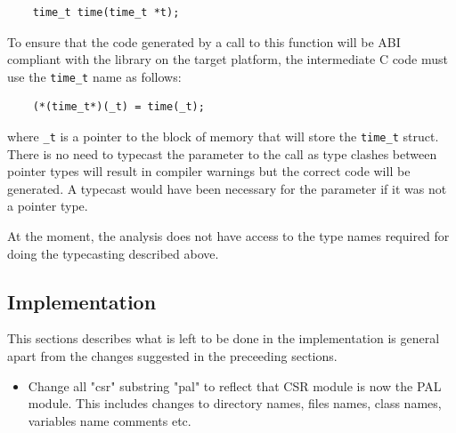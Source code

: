 \begin{verbatim}
    time_t time(time_t *t);
\end{verbatim}

To ensure that the code generated by a call to this function
will be ABI compliant with the library on the target platform, the
intermediate C code must use the {\tt time\_t} name as follows:

\begin{verbatim}
    (*(time_t*)(_t) = time(_t);
\end{verbatim}

where {\tt \_t} is a pointer to the block of memory that will store
the {\tt time\_t} struct. There is no need to typecast the parameter
to the call as type clashes between pointer types will result in
compiler warnings but the correct code will be generated. A typecast 
would have been necessary for the parameter if it was not a pointer type.

At the moment, the analysis does not have access to the type names
required for doing the typecasting described above.

\subsection{Implementation}

This sections describes what is left to be done in the implementation
is general apart from the changes suggested in the preceeding
sections.

\begin{itemize}
\item Change all "csr" substring "pal" to reflect that CSR module is
now the PAL module. This includes changes to directory names, files
names, class names, variables name comments etc.
\end{itemize}

